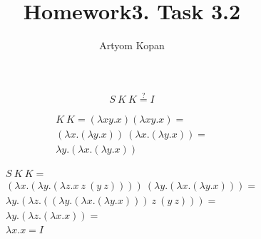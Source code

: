 \documentclass{article}
\title{Homework3. Task 3.2}
\author{Artyom Kopan}
\begin{document}
\huge
\maketitle

$$
S\:K\:K \overset{?}{=} I
$$

\begin{gather}
K\:K = (\lambda xy.x)(\lambda xy.x) =\\ (\lambda x.(\lambda y.x))\:(\lambda x.(\lambda y.x)) =\\ \lambda y.(\lambda x.(\lambda y.x))
\end{gather}

\begin{gather}
S\:K\:K =\\ (\lambda x.(\lambda y.(\lambda z.x\:z\:(y\:z))))\:(\lambda y.(\lambda x.(\lambda y.x))) =\\ \lambda y.(\lambda z.((\lambda y.(\lambda x.(\lambda y.x)))\:z\:(y\:z))) =\\ \lambda y.(\lambda z.(\lambda x.x)) =\\ \lambda x.x = I
\end{gather}
\end{document}
